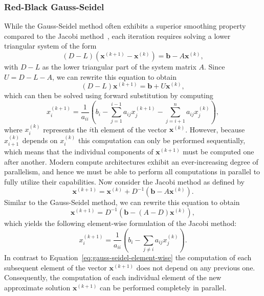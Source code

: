 \subsubsection{Red-Black Gauss-Seidel}
\label{sec:rb-gs}
While the Gauss-Seidel method often exhibits a superior smoothing property compared to the Jacobi method~\cite{briggs2000multigrid,trottenberg2000multigrid}, each iteration requires solving a lower triangular system of the form
\begin{equation*}
	(D - L) (\bm{x}^{(k+1)} - \bm{x}^{(k)}) = \bm{b} - A \bm{x}^{(k)},
\end{equation*}
with $D - L$ as the lower triangular part of the system matrix $A$.
Since $U = D - L - A$, we can rewrite this equation to obtain
\begin{equation}
	(D - L) \bm{x}^{(k+1)} = \bm{b} + U \bm{x}^{(k)},
\end{equation}  
which can then be solved using forward substitution by computing
\begin{equation}
	x_{i}^{(k+1)}={\frac {1}{a_{ii}}}\left(b_{i}-\sum _{j=1}^{i-1}a_{ij}x_{j}^{(k+1)}-\sum _{j=i+1}^{n}a_{ij}x_{j}^{(k)}\right),
	\label{eq:gauss-seidel-element-wise}
\end{equation}
where $x_{i}^{(k)}$ represents the $i$th element of the vector $\bm{x}^{(k)}$.
However, because $x_{i+1}^{(k)}$ depends on $x_{i}^{(k)}$ this computation can only be performed sequentially, which means that the individual components of $\bm{x}^{(k+1)}$ must be computed one after another. 
Modern compute architectures exhibit an ever-increasing degree of parallelism, and hence we must be able to perform all computations in parallel to fully utilize their capabilities.
Now consider the Jacobi method as defined by 
\begin{equation*}
	\bm{x}^{(k+1)} = \bm{x}^{(k)} + D^{-1}(\bm b - A \bm{x}^{(k)}).
\end{equation*}
Similar to the Gauss-Seidel method, we can rewrite this equation to obtain
\begin{equation}
	\bm{x}^{(k+1)} = D^{-1}(\bm b - (A - D)\bm{x}^{(k)}),
\end{equation}
which yields the following element-wise formulation of the Jacobi method:
\begin{equation}
x_{i}^{(k+1)}={\frac {1}{a_{ii}}}\left(b_{i}-\sum _{j\neq i}a_{ij}x_{j}^{(k)}\right).
	\label{eq:jacobi-element-wise}
\end{equation}
In contrast to Equation~\eqref{eq:gauss-seidel-element-wise} the computation of each subsequent element of the vector $\bm{x}^{(k+1)}$ does not depend on any previous one.
Consequently, the computation of each individual element of the new approximate solution $\bm{x}^{(k+1)}$ can be performed completely in parallel.

